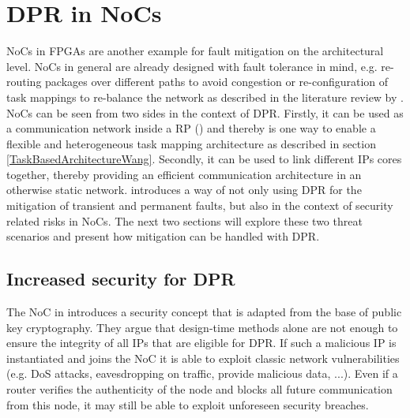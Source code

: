 \section{\gls{DPR} in \glspl{NoC}}
\glspl{NoC} in \glspl{FPGA} are another example for fault mitigation on the architectural level. 
\glspl{NoC} in general are already designed with fault tolerance in mind, e.g. re-routing packages over different paths to avoid congestion or re-configuration of task mappings to re-balance the network as described in the literature review by \cite{kadri_survey_2019}.
\glspl{NoC} can be seen from two sides in the context of \gls{DPR}. 
Firstly, it can be used as a communication network inside a \gls{RP} (\cite{majer_packet_2005}) and thereby is one way to enable a flexible and heterogeneous task mapping architecture as described in section \ref{TaskBasedArchitectureWang}. 
Secondly, it can be used to link different \glspl{IP} cores together, thereby providing an efficient communication architecture in an otherwise static network.
\cite{wehbe_secure_2016}  introduces a way of not only using \gls{DPR} for the mitigation of transient and permanent faults, but also in the context of security related risks in \glspl{NoC}.
The next two sections will explore these two threat scenarios and present how mitigation can be handled with \gls{DPR}. 

\subsection{Increased security for \gls{DPR}}
The \gls{NoC} in \cite{wehbe_secure_2016} introduces a security concept that is adapted from the base of public key cryptography. 
They argue that design-time methods alone are not enough to ensure the integrity of all \glspl{IP} that are eligible for \gls{DPR}.
If such a malicious \gls{IP} is instantiated and joins the \gls{NoC} it is able to exploit classic network vulnerabilities (e.g. \gls{DoS} attacks, eavesdropping on traffic, provide malicious data, ...).
Even if a router verifies the authenticity of the node and blocks all future communication from this node, it may still be able to exploit unforeseen security breaches.  

